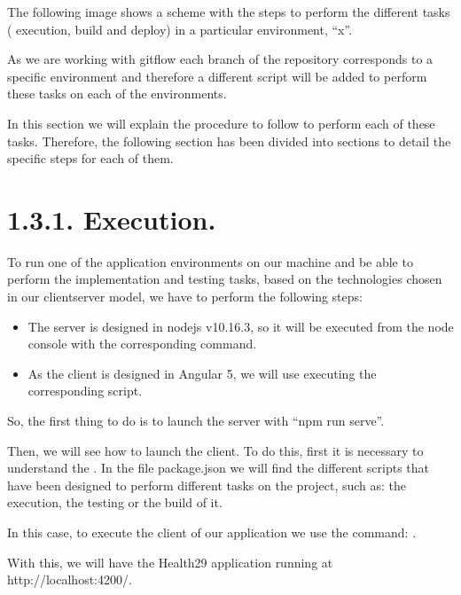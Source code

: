 \documentclass[letterpaper,10pt,english]{sphinxmanual}
\begin{document}
The following image shows a scheme with the steps to perform the different tasks ( execution, build and deploy) in a particular environment, “x”.



As we are working with gitflow each branch of the repository corresponds to a specific environment and therefore a different script will be added to perform these tasks on each of the environments.

In this section we will explain the procedure to follow to perform each of these tasks. Therefore, the following section has been divided into sections to detail the specific steps for each of them.


\section{1.3.1. Execution.}
\label{\detokenize{pages/Environments/Build_deploy:execution}}
To run one of the application environments on our machine and be able to perform the implementation and testing tasks, based on the technologies chosen in our client\sphinxhyphen{}server model, we have to perform the following steps:
\begin{itemize}
\item {} 
The server is designed in nodejs v10.16.3, so it will be executed from the node console with the corresponding command.

\item {} 
As the client is designed in Angular 5, we will use  executing the corresponding script.

\end{itemize}

So, the first thing to do is to launch the server with “npm run serve”.

Then, we will see how to launch the client. To do this, first it is necessary to understand the . In the file package.json we will find the different scripts that have been designed to perform different tasks on the project, such as: the execution, the testing or the build of it.

In this case, to execute the client of our application we use the command: .

With this, we will have the Health29 application running at http://localhost:4200/.
\end{document}
